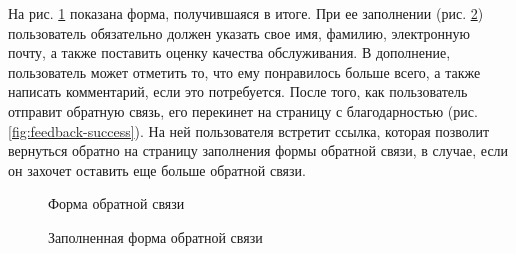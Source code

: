 \documentclass[a4paper, 14pt]{extarticle}
\begin{document}
На рис. \ref{fig:feedback-clear-form} показана форма, получившаяся в итоге. При
ее заполнении (рис. \ref{fig:feedback-filled-form}) пользователь обязательно
должен указать свое имя, фамилию, электронную почту, а также поставить оценку
качества обслуживания. В дополнение, пользователь может отметить то, что ему
понравилось больше всего, а также написать комментарий, если это потребуется.
После того, как пользователь отправит обратную связь, его перекинет на страницу
с благодарностью (рис. \ref{fig:feedback-success}). На ней пользователя встретит
ссылка, которая позволит вернуться обратно на страницу заполнения формы обратной
связи, в случае, если он захочет оставить еще больше обратной связи.

\begin{figure}[H]
  \centering
  \caption{Форма обратной связи}
  \label{fig:feedback-clear-form}
\end{figure}

\begin{figure}[H]
  \centering
  \caption{Заполненная форма обратной связи}
  \label{fig:feedback-filled-form}
\end{figure}
\end{document}

